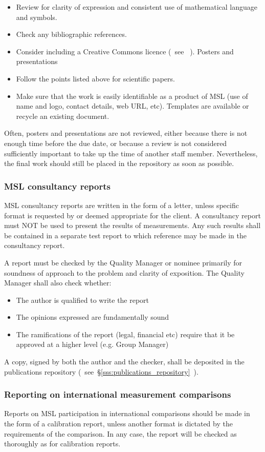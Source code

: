 \begin{itemize}
\item  Review for clarity of expression and consistent use of mathematical language and symbols.  
\item  Check any bibliographic references. 
\item  Consider including a Creative Commons licence (~see \cite{MSL_Reporting_Guidelines}~).
 Posters and presentations
\item  Follow the points listed above for scientific papers.
\item  Make sure that the work is easily identifiable as a product of MSL (use of name and logo, contact details, web URL, etc). Templates are available or recycle an existing document.
\end{itemize} 

Often, posters and presentations are not reviewed, either because there is not enough time before the due date, or because a review is not considered sufficiently important to take up the time of another staff member. Nevertheless, the final work should still be placed in the repository as soon as possible. 

\subsubsection{MSL consultancy reports}
MSL consultancy reports are written in the form of a letter, unless specific format is requested by or deemed appropriate for the client.
A consultancy report must NOT be used to present the results of measurements. Any such results shall be contained in a separate test report to which reference may be made in the consultancy report.

A report must be checked by the Quality Manager or nominee primarily for soundness of approach to the problem and clarity of exposition. The Quality Manager shall also check whether: 
\begin{itemize}
\item  The author is qualified to write the report
\item  The opinions expressed are fundamentally sound
\item  The ramifications of the report (legal, financial etc) require that it be approved at a higher level (e.g. Group Manager)
\end{itemize}
A copy, signed by both the author and the checker, shall be deposited in the publications repository (~see~\S\ref{sss:publications_repository}~). 

\subsubsection{Reporting on international measurement comparisons}
Reports on MSL participation in international comparisons should be made in the form of a calibration report, unless another format is dictated by the requirements of the comparison. In any case, the report will be checked as thoroughly as for calibration reports.

